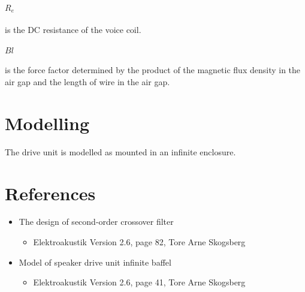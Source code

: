 \paragraph{$R_e$} is the DC resistance of the voice coil.

\paragraph{$Bl$} is the force factor determined by the product of the magnetic flux density in the air gap and the length of wire in the air gap.

\section{Modelling}
The drive unit is modelled as mounted in an infinite enclosure.  

\section{References}
\begin{itemize}
	\item The design of second-order crossover filter
	\begin{itemize}
		\item Elektroakustik Version 2.6, page 82, Tore Arne Skogsberg
	\end{itemize}
	\item Model of speaker drive unit infinite baffel
	\begin{itemize}
		\item Elektroakustik Version 2.6, page 41, Tore Arne Skogsberg
	\end{itemize}
\end{itemize}



\FloatBarrier
